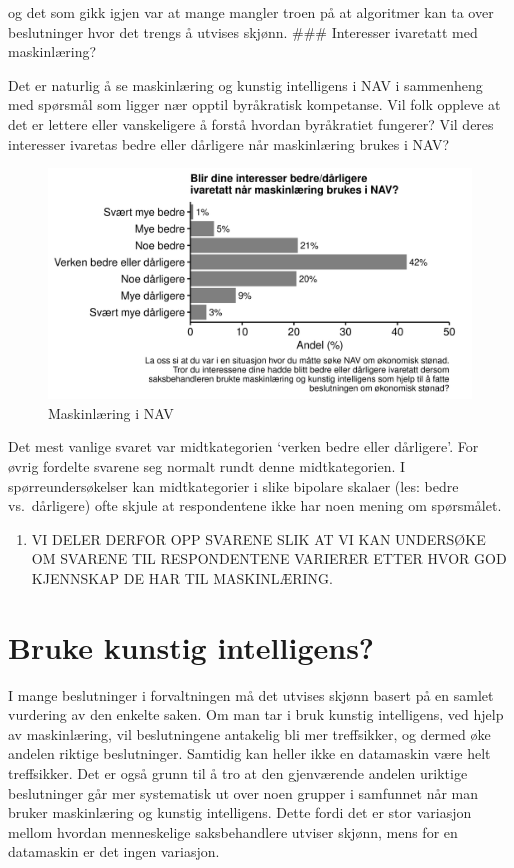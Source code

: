 \documentclass[
]{book}
\providecommand{\tightlist}{%
  \setlength{\itemsep}{0pt}\setlength{\parskip}{0pt}}
\begin{document}
og det som gikk igjen var at mange mangler troen på at algoritmer kan ta over beslutninger hvor det trengs å utvises skjønn.
\#\#\# Interesser ivaretatt med maskinlæring?

Det er naturlig å se maskinlæring og kunstig intelligens i NAV i sammenheng med spørsmål som ligger nær opptil byråkratisk kompetanse.
Vil folk oppleve at det er lettere eller vanskeligere å forstå hvordan byråkratiet fungerer?
Vil deres interesser ivaretas bedre eller dårligere når maskinlæring brukes i NAV?

\begin{figure}
\centering
\includegraphics{figs/png/fig_nav_ml_helps_interest.png}
\caption{Maskinlæring i NAV}
\end{figure}

Det mest vanlige svaret var midtkategorien `verken bedre eller dårligere'.
For øvrig fordelte svarene seg normalt rundt denne midtkategorien.
I spørreundersøkelser kan midtkategorier i slike bipolare skalaer (les: bedre vs.~dårligere) ofte skjule at respondentene ikke har noen mening om spørsmålet.

\begin{enumerate}
\def\labelenumi{\arabic{enumi}.}
\tightlist
\item
  VI DELER DERFOR OPP SVARENE SLIK AT VI KAN UNDERSØKE OM SVARENE TIL RESPONDENTENE VARIERER ETTER HVOR GOD KJENNSKAP DE HAR TIL MASKINLÆRING.
\end{enumerate}

\hypertarget{bruke-kunstig-intelligens}{%
\section{Bruke kunstig intelligens?}\label{bruke-kunstig-intelligens}}

I mange beslutninger i forvaltningen må det utvises skjønn basert på en samlet vurdering av den enkelte saken.
Om man tar i bruk kunstig intelligens, ved hjelp av maskinlæring, vil beslutningene antakelig bli mer treffsikker, og dermed øke andelen riktige beslutninger.
Samtidig kan heller ikke en datamaskin være helt treffsikker.
Det er også grunn til å tro at den gjenværende andelen uriktige beslutninger går mer systematisk ut over noen grupper i samfunnet når man bruker maskinlæring og kunstig intelligens.
Dette fordi det er stor variasjon mellom hvordan menneskelige saksbehandlere utviser skjønn, mens for en datamaskin er det ingen variasjon.
\end{document}
